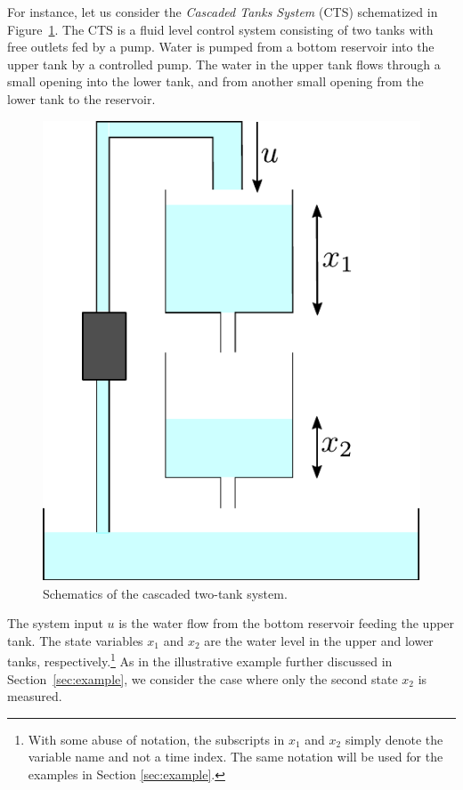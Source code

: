 \documentclass{article} %
\begin{document}
For instance, let us consider the \emph{Cascaded Tanks System} (CTS) schematized in Figure~\ref{fig:CTS}. 
The CTS is a fluid level control system consisting of two tanks with free outlets fed by a pump.  
Water is pumped from a bottom reservoir into the upper tank by a controlled pump.
The  water in the upper tank flows through a small opening into the lower tank, and from another small opening from the lower tank to the reservoir. 
\begin{figure}
\centering
 \includegraphics[width=.4\textwidth]{fig/CTS/CTS_scheme.pdf}
 \caption{Schematics of the cascaded two-tank system.}
 \label{fig:CTS}
\end{figure}

The system input $u$ is the water flow from the bottom reservoir feeding the upper tank.
The state variables $x_1$ and $x_2$ are the water level in the upper and lower tanks, respectively.\footnote{With some abuse of notation, the subscripts in $x_1$ and $x_2$ simply denote the variable name and not a time index. The same notation will be used for the examples in Section \ref{sec:example}.}
As in the illustrative  example further discussed in Section~\ref{sec:example}, we consider the case where only the second state $x_2$ is  measured.
\end{document}
